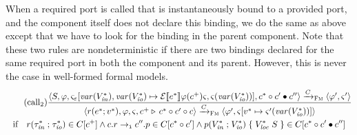 \documentclass[a4paper,10pt,english]{article}
\begin{document}
When a required port is called that is instantaneously bound to a provided port, and the component itself
does not declare this binding, we do the same as above except that we have to look for the binding in the parent component. Note
that these two rules are nondeterministic if there are two bindings declared for the same required port in both the component and
its parent. However, this is never the case in well-formed formal models.
\begin{multline*}
	\tag{call${}_2$}
	\dfrac
	{
		\configurationFm{\stmFm, \fieldEnv, \varEnvFm_\missing[\varof(\toList{\varDecl}_\mathit{in}), \varof(\toList{\varDecl}_\mathit{io}) \mapsto
		\ExprSem{\toList{\expr}}\fieldEnv(\toListNE{\comp})\varEnvFm, \varEnvFm(\varof(\toList{\varDecl}_\mathit{io}))],
		\toList{\comp} \cons \comp' \unionCons \comp''}
			\stmArrowFm
		\configurationFm{\fieldEnv', \varEnvFm'}
	}
	{
		\configurationFm{\invoke{\reqPort}{\toList{\expr}}{\toList{\var}}, \fieldEnv, \varEnvFm, \toListNE{\comp}
		\triangleright \, \toList{\comp} \cons \comp' \cons \comp}
			\stmArrowFm
		\configurationFm{\fieldEnv', \varEnvFm[\toList{\var} \mapsto \varEnvFm'(\varof(\toList{\varDecl_\mathit{io}}))]}
	}
	\\ \text{if} \quad \reqPortDeclSyn{\reqPort}{\toList{\type_\mathit{in}}}{\toList{\type_\mathit{io}}} \in
		\compDecl[\toListNE{\comp}] 
	\wedge 
	\bindingDeclSyn{\qualifiedName{\comp}{\reqPort}}{\qualifiedName{\comp''}{\provPort}}{\instantBinding} \in
		\compDecl[\toList{\comp} \cons \comp']
	\wedge
	\provPortDeclSyn{\provPort}{\toList{\varDecl_\mathit{in}}}{\toList{\varDecl_\mathit{io}}}{\toList{\varDecl_\mathit{loc}}}{\stmFm}
	\in	\compDecl[\toList{\comp} \cons \comp' \unionCons \comp'']
\end{multline*}
\end{document}
